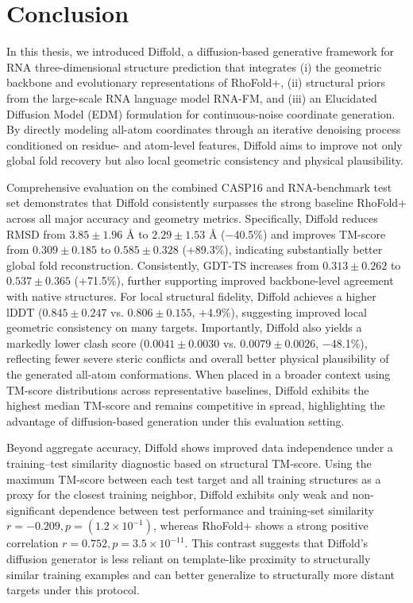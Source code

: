 \chapter{Conclusion}

In this thesis, we introduced Diffold, a diffusion-based generative framework for RNA three-dimensional structure prediction that integrates (i) the geometric backbone and evolutionary representations of RhoFold+, (ii) structural priors from the large-scale RNA language model RNA-FM, and (iii) an Elucidated Diffusion Model (EDM) formulation for continuous-noise coordinate generation. By directly modeling all-atom coordinates through an iterative denoising process conditioned on residue- and atom-level features, Diffold aims to improve not only global fold recovery but also local geometric consistency and physical plausibility.

Comprehensive evaluation on the combined CASP16 and RNA-benchmark test set demonstrates that Diffold consistently surpasses the strong baseline RhoFold+ across all major accuracy and geometry metrics. Specifically, Diffold reduces RMSD from $3.85 \pm 1.96$ $\text{\AA}$ to $2.29 \pm 1.53$ $\text{\AA}$ (−40.5\%) and improves TM-score from $0.309 \pm 0.185$ to $0.585 \pm 0.328$ (+89.3\%), indicating substantially better global fold reconstruction. Consistently, GDT-TS increases from $0.313 \pm 0.262$ to $0.537 \pm 0.365$ (+71.5\%), further supporting improved backbone-level agreement with native structures. For local structural fidelity, Diffold achieves a higher lDDT ($0.845 \pm 0.247$ vs. $0.806 \pm 0.155$, +4.9\%), suggesting improved local geometric consistency on many targets. Importantly, Diffold also yields a markedly lower clash score ($0.0041 \pm 0.0030$ vs. $0.0079 \pm 0.0026$, −48.1\%), reflecting fewer severe steric conflicts and overall better physical plausibility of the generated all-atom conformations. When placed in a broader context using TM-score distributions across representative baselines, Diffold exhibits the highest median TM-score and remains competitive in spread, highlighting the advantage of diffusion-based generation under this evaluation setting.

Beyond aggregate accuracy, Diffold shows improved data independence under a training–test similarity diagnostic based on structural TM-score. Using the maximum TM-score between each test target and all training structures as a proxy for the closest training neighbor, Diffold exhibits only weak and non-significant dependence between test performance and training-set similarity $r = −0.209, p = (1.2\times10^{-1})$, whereas RhoFold+ shows a strong positive correlation $r = 0.752, p = 3.5\times10^{-11}$. This contrast suggests that Diffold’s diffusion generator is less reliant on template-like proximity to structurally similar training examples and can better generalize to structurally more distant targets under this protocol.

